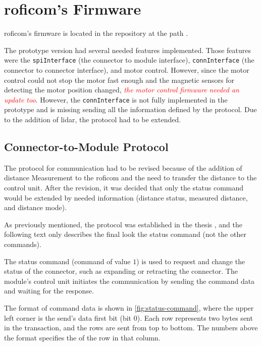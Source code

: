 \documentclass[
  digital,     %
  oneside,     %
  nosansbold,  %
  nocolorbold, %
  nolof,         %
  nolot,         %
]{fithesis4}
\newcommand{\TODO}[1]{\textcolor{red}{\textit{#1}}}
\begin{document}
{{{%

\section[ RoFICoM's Firmware ]{ \acrshort{roficom}'s Firmware } \label{sec:roficom-firmware}
\acrshort{roficom}'s firmware is located in the repository at the path .

The prototype version had several needed features implemented. Those features were the \lstinline|spiInterface| (the connector to module interface), \lstinline|connInterface| (the connector to connector interface), and motor control. However, since the motor control could not stop the motor fast enough and the magnetic sensors for detecting the motor position changed, \TODO{the motor control firmware needed an update too}. However, the \lstinline|connInterface| is not fully implemented in the prototype and is missing sending all the information defined by the protocol. Due to the addition of lidar, the protocol had to be extended.

\subsection{ Connector-to-Module Protocol }

The protocol for communication had to be revised because of the addition of distance Measurement to the \acrshort{roficom} and the need to transfer the distance to the control unit. After the revision, it was decided that only the status command would be extended by needed information (distance status, measured distance, and distance mode).

As previously mentioned, the protocol was established in the thesis \cite[p.~19--22]{Mrazek2019thesis}, and the following text only describes the final look the status command (not the other commands).

The status command (command of value $1$) is used to request and change the status of the connector, such as expanding or retracting the connector. The module's control unit initiates the communication by sending the command data and waiting for the response.

The format of command data is shown in \autoref{fig:status-command}, where the upper left corner is the send's data first bit (bit $0$). Each row represents two bytes sent in the transaction, and the rows are sent from top to bottom. The numbers above the format specifies the of the row in that column.

}}}
\end{document}
